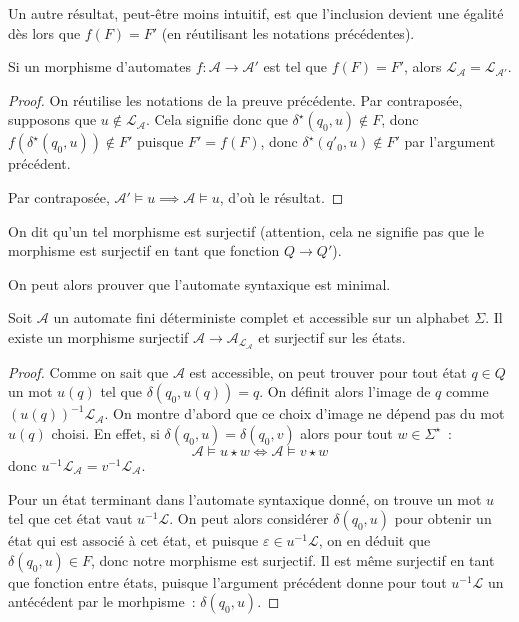 Un autre résultat, peut-être moins intuitif, est que l'inclusion devient une
égalité dès lors que $f(F) = F'$ (en réutilisant les notations précédentes).

\begin{proposition}
  Si un morphisme d'automates $f : \mathcal A \to \mathcal A'$ est tel que
  $f(F) = F'$, alors $\mathcal L_\mathcal A = \mathcal L_{\mathcal A'}$.
\end{proposition}

\begin{proof}
  On réutilise les notations de la preuve précédente. Par contraposée, supposons
  que $u \notin \mathcal L_\mathcal A$. Cela signifie donc que
  $\delta^\star(q_0,u) \notin F$, donc $f(\delta^\star(q_0,u)) \notin F'$ puisque
  $F' = f(F)$, donc $\delta^\star(q'_0,u)\notin F'$ par l'argument précédent.

  Par contraposée, $\mathcal A'\models u \implies \mathcal A \models u$, d'où
  le résultat.
\end{proof}

On dit qu'un tel morphisme est surjectif (attention, cela ne signifie pas que le
morphisme est surjectif en tant que fonction $Q \to Q'$).

On peut alors prouver que l'automate syntaxique est minimal.

\begin{proposition}
  Soit $\mathcal A$ un automate fini déterministe complet et accessible sur un
  alphabet $\Sigma$. Il existe un morphisme surjectif
  $\mathcal A \to \mathcal A_{\mathcal L_\mathcal A}$ et surjectif sur les états.
\end{proposition}

\begin{proof}
  Comme on sait que $\mathcal A$ est accessible, on peut trouver pour tout état
  $q \in Q$ un mot $u(q)$ tel que $\delta(q_0,u(q)) = q$. On définit alors
  l'image de $q$ comme $(u(q))^{-1}\mathcal L_\mathcal A$. On montre d'abord que
  ce choix d'image ne dépend pas du mot $u(q)$ choisi. En effet, si
  $\delta(q_0,u) = \delta(q_0,v)$ alors pour tout $w \in \Sigma^\star$~:
  \[\mathcal A \models u\star w \iff \mathcal A \models v \star w\]
  donc $u^{-1}\mathcal L_\mathcal A = v^{-1}\mathcal L_\mathcal A$.

  Pour un état terminant dans l'automate syntaxique donné, on trouve un mot
  $u$ tel que cet état vaut $u^{-1}\mathcal L$. On peut alors considérer
  $\delta(q_0,u)$ pour obtenir un état qui est associé à cet état, et puisque
  $\varepsilon \in u^{-1}\mathcal L$, on en déduit que $\delta(q_0,u)\in F$,
  donc notre morphisme est surjectif. Il est même surjectif en tant que fonction
  entre états, puisque l'argument précédent donne pour tout $u^{-1}\mathcal L$
  un antécédent par le morhpisme~: $\delta(q_0,u)$.
\end{proof}

